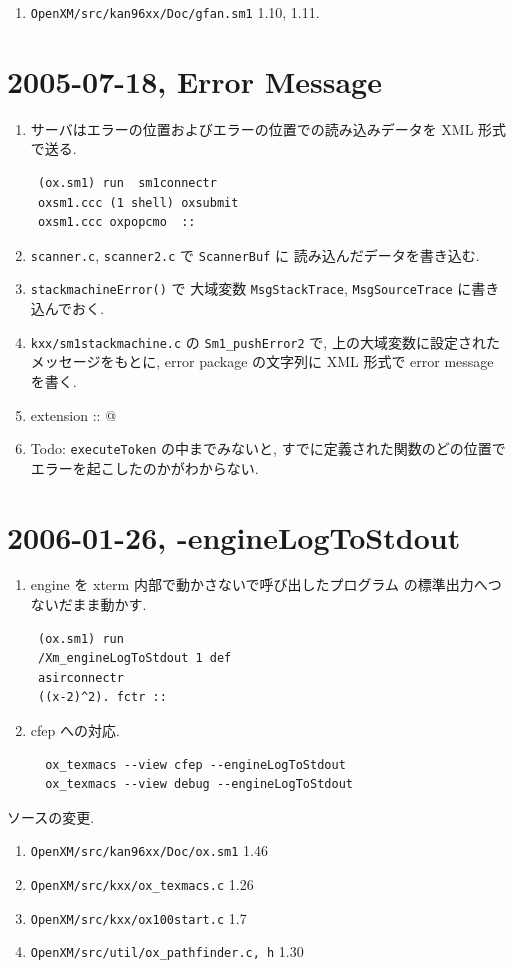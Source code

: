 \documentclass{jarticle}
\begin{document}
\begin{enumerate}
\item {\tt OpenXM/src/kan96xx/Doc/gfan.sm1} 1.10, 1.11.
\end{enumerate}

\section{2005-07-18, Error Message}
\begin{enumerate}
\item  サーバはエラーの位置およびエラーの位置での読み込みデータを
XML 形式で送る.
\begin{verbatim}
 (ox.sm1) run  sm1connectr
 oxsm1.ccc (1 shell) oxsubmit 
 oxsm1.ccc oxpopcmo  ::
\end{verbatim}
\item {\tt scanner.c}, {\tt scanner2.c} で {\tt ScannerBuf} に
 読み込んだデータを書き込む.
\item {\tt stackmachineError()} で 
 大域変数 {\tt MsgStackTrace}, {\tt MsgSourceTrace} に書き込んでおく.
\item {\tt kxx/sm1stackmachine.c} の {\tt Sm1\_pushError2} で,
上の大域変数に設定されたメッセージをもとに,  error package
の文字列に XML 形式で error message を書く.
\item \verb@ [(traceShowScannerBuf)] extension :: @
\item Todo: {\tt executeToken} の中までみないと, すでに定義された関数のどの位置でエラーを起こしたのかがわからない.
\end{enumerate}

\section{2006-01-26, -engineLogToStdout}
\begin{enumerate}
\item   engine を xterm 内部で動かさないで呼び出したプログラム
の標準出力へつないだまま動かす.
\begin{verbatim}
 (ox.sm1) run 
 /Xm_engineLogToStdout 1 def
 asirconnectr 
 ((x-2)^2). fctr ::
\end{verbatim}
\item   cfep への対応.
\begin{verbatim}
  ox_texmacs --view cfep --engineLogToStdout
  ox_texmacs --view debug --engineLogToStdout
\end{verbatim}
\end{enumerate}

ソースの変更.
\begin{enumerate}
\item {\tt OpenXM/src/kan96xx/Doc/ox.sm1} 1.46
\item {\tt OpenXM/src/kxx/ox\_texmacs.c} 1.26
\item {\tt OpenXM/src/kxx/ox100start.c}  1.7
\item {\tt OpenXM/src/util/ox\_pathfinder.c, h} 1.30
\end{enumerate}
\end{document}
